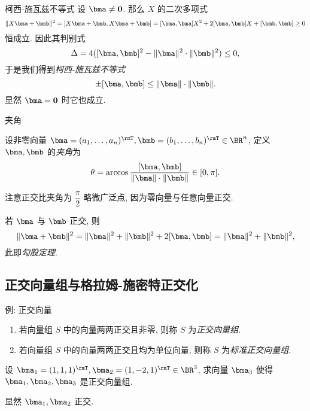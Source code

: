 \begin{frame}{柯西-施瓦兹不等式\noexer}
	\onslide<+->
	设 $\bma\neq{\bf0}$.
	\onslide<+->
	那么 $X$ 的二次多项式
	\[\|X\bma+\bmb\|^2=[X\bma+\bmb,X\bma+\bmb]
	=[\bma,\bma]X^2+2[\bma,\bmb]X+[\bmb,\bmb]\ge0\]
	恒成立.
	\onslide<+->
	因此其判别式
	\[\Delta=4([\bma,\bmb]^2-\|\bma\|^2\cdot\|\bmb\|^2)\le 0,\]
	\onslide<+->
	于是我们得到\emph{柯西-施瓦兹不等式}
	\[\pm[\bma,\bmb]\le \|\bma\|\cdot\|\bmb\|.\]
	\onslide<+->
	显然 $\bma={\bf0}$ 时它也成立.
\end{frame}


\begin{frame}{夹角}
	\onslide<+->
	\begin{definition}
		设非零向量 $\bma=(a_1,\dots,a_n)^\rmT,\bmb=(b_1,\dots,b_n)^\rmT\in\BR^n$, 定义 $\bma,\bmb$ 的\emph{夹角}为
		\[\theta=\arccos\dfrac{[\bma,\bmb]}{\|\bma\|\cdot\|\bmb\|}\in[0,\pi].\]
	\end{definition}
	\onslide<+->
	注意正交比夹角为 $\dfrac\pi2$ 略微广泛点, 因为零向量与任意向量正交.

	\onslide<+->
	若 $\bma$ 与 $\bmb$ 正交, 则
	\[\|\bma+\bmb\|^2=\|\bma\|^2+\|\bmb\|^2+2[\bma,\bmb]=\|\bma\|^2+\|\bmb\|^2,\]
	\onslide<+->
	此即\emph{勾股定理}.
\end{frame}

\subsection{正交向量组与格拉姆-施密特正交化}

\begin{frame}{例: 正交向量}
	\onslide<+->
	\begin{definition}
		\begin{enumerate}
			\item 若向量组 $S$ 中的向量两两正交且非零, 则称 $S$ 为\emph{正交向量组}.
			\item 若向量组 $S$ 中的向量两两正交且均为单位向量, 则称 $S$ 为\emph{标准正交向量组}.
		\end{enumerate}
	\end{definition}
	\onslide<+->
	\begin{example}
		设 $\bma_1=(1,1,1)^\rmT,\bma_2=(1,-2,1)^\rmT\in\BR^3$.
		求向量 $\bma_3$ 使得 $\bma_1,\bma_2,\bma_3$ 是正交向量组.
	\end{example}
	\onslide<+->
	\begin{solution}
		显然 $\bma_1,\bma_2$ 正交.
		\onslide<+->{%
			故可取 $\bma_3=(1,0,-1)^\rmT$.
		}
	\end{solution}
\end{frame}


